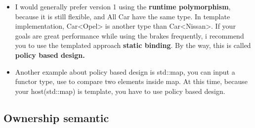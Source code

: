 \documentclass[a4paper,11pt,twoside]{book}
\begin{document}
\begin{itemize}
	\item I would generally prefer version 1 using the \textbf{runtime polymorphism}, because it is still flexible, and All Car  have the same type. In template implementation,  Car<Opel> is another type than Car<Nissan>. If your goals are great performance while using the brakes frequently, i recommend you to use the templated approach \textbf{static binding}. By the way, this is called \textbf{policy based design.}
	
	\item Another example about policy based design is std::map, you can input a functor type, use to compare two elements inside map. At this time, because your host(std::map) is template, you have to use policy based design.
\end{itemize}


\subsection{Ownership semantic}
\end{document}
